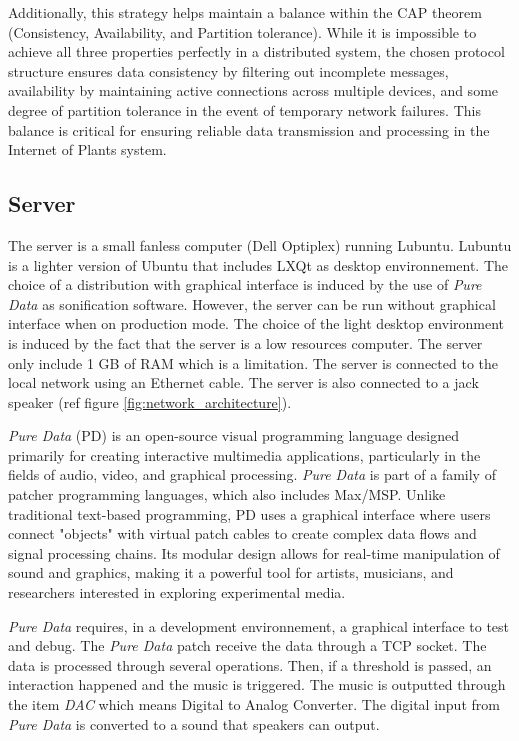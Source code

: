 Additionally, this strategy helps maintain a balance within the CAP theorem (Consistency, Availability, and Partition tolerance). While it is impossible to achieve all three properties perfectly in a distributed system, the chosen protocol structure ensures data consistency by filtering out incomplete messages, availability by maintaining active connections across multiple devices, and some degree of partition tolerance in the event of temporary network failures. This balance is critical for ensuring reliable data transmission and processing in the Internet of Plants system.





\subsection{Server}

The server is a small fanless computer (Dell Optiplex) running Lubuntu. Lubuntu is a lighter version of Ubuntu that includes LXQt as desktop environnement. The choice of a distribution with graphical interface is induced by the use of \textit{Pure Data} as sonification software. However, the server can be run without graphical interface when on production mode. The choice of the light desktop environment is induced by the fact that the server is a low resources computer. The server only include 1 GB of RAM which is a limitation. The server is connected to the local network using an Ethernet cable. The server is also connected to a jack speaker (ref figure \ref{fig:network_architecture}).





\textit{Pure Data} (PD) is an open-source visual programming language designed primarily for creating interactive multimedia applications, particularly in the fields of audio, video, and graphical processing.
\textit{Pure Data} is part of a family of patcher programming languages, which also includes Max/MSP.
Unlike traditional text-based programming, PD uses a graphical interface where users connect
"objects" with virtual patch cables to create complex data flows and signal processing chains.
Its modular design allows for real-time manipulation of sound and graphics, making it a powerful
tool for artists, musicians, and researchers interested in exploring experimental media.

\textit{Pure Data} requires, in a development environnement, a graphical interface to test and debug.
The \textit{Pure Data} patch receive the data through a TCP socket. The data is processed through several
operations. Then, if a threshold is passed, an interaction happened and the music is triggered.
The music is outputted through the item \textit{DAC} which means Digital to Analog Converter.
The digital input from \textit{Pure Data} is converted to a sound that speakers can output.

